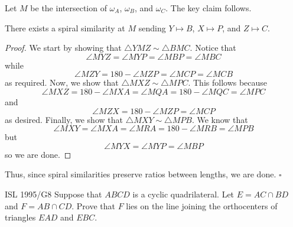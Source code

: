 \documentclass{article}
\begin{document}
Let $M$ be the intersection of $\omega_A$, $\omega_B$, and $\omega_C$. The key claim follows.

\begin{claim*}
There exists a spiral similarity at $M$ sending $Y \mapsto B$, $X \mapsto P$, and $Z \mapsto C$.
\end{claim*}
\begin{proof}
We start by showing that $\triangle YMZ \sim \triangle BMC$. Notice that \[\angle MYZ = \angle MYP = \angle MBP = \angle MBC\] while \[\angle MZY = 180 - \angle MZP = \angle MCP = \angle MCB\] as required. Now, we show that $\triangle MXZ \sim \triangle MPC$. This follows because \[\angle MXZ = 180 - \angle MXA = \angle MQA = 180 - \angle MQC = \angle MPC\] and \[\angle MZX = 180 - \angle MZP = \angle MCP\] as desired. Finally, we show that $\triangle MXY \sim \triangle MPB$. We know that \[\angle MXY = \angle MXA = \angle MRA = 180 - \angle MRB = \angle MPB\] but \[\angle MYX = \angle MYP = \angle MBP\] so we are done.
\end{proof}

Thus, since spiral similarities preserve ratios between lengths, we are done. $\square$

\newpage

\begin{problem}[10.19]{ISL 1995/G8}
Suppose that $ABCD$ is a cyclic quadrilateral. Let $E = AC \cap BD$ and $F = AB \cap CD$. Prove that $F$ lies on the line joining the orthocenters of triangles $EAD$ and $EBC$.
\end{problem}
\end{document}
